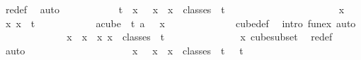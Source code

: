 \begin{isabellebody}
\ redef\ \isamarkupfalse%
\ auto\isanewline
\ \ \ \ \ \ \ \ \isamarkupfalse%
\ \isamarkupfalse%
\ {\isachardoublequoteopen}{\isacharbraceleft}{\kern0pt}{\isachardot}{\kern0pt}{\isachardot}{\kern0pt}{\isacharless}{\kern0pt}t{\isacharbraceright}{\kern0pt}\ {\isasymsubseteq}\ {\isacharbraceleft}{\kern0pt}x\ {}\ {\isacharbar}{\kern0pt}\ x\ {\isachardot}{\kern0pt}\ x\ {\isasymin}\ classes\ {}\ t\ {}{\isacharbraceright}{\kern0pt}{\isachardoublequoteclose}\ \isanewline
\ \ \ \ \ \ \ \ \isamarkupfalse%
\isanewline
\ \ \ \ \ \ \ \ \ \ \isamarkupfalse%
\ x\ \isamarkupfalse%
\ x{\isacharcolon}{\kern0pt}\ {\isachardoublequoteopen}x\ {\isasymin}\ {\isacharbraceleft}{\kern0pt}{\isachardot}{\kern0pt}{\isachardot}{\kern0pt}{\isacharless}{\kern0pt}t{\isacharbraceright}{\kern0pt}{\isachardoublequoteclose}\isanewline
\ \ \ \ \ \ \ \ \ \ \isamarkupfalse%
\ {\isachardoublequoteopen}{\isasymexists}a{\isasymin}cube\ {}\ t{\isachardot}{\kern0pt}\ a\ {}\ {\isacharequal}{\kern0pt}\ x{\isachardoublequoteclose}\isanewline
\ \ \ \ \ \ \ \ \ \ \ \ \isamarkupfalse%
\ cube{\isacharunderscore}{\kern0pt}def\ \isamarkupfalse%
\ {\isacharparenleft}{\kern0pt}intro\ fun{\isacharunderscore}{\kern0pt}ex{\isacharparenright}{\kern0pt}\ auto\isanewline
\ \ \ \ \ \ \ \ \ \ \isamarkupfalse%
\ \isamarkupfalse%
\ {\isachardoublequoteopen}x\ {\isasymin}\ {\isacharbraceleft}{\kern0pt}x\ {}\ {\isacharbar}{\kern0pt}x{\isachardot}{\kern0pt}\ x\ {\isasymin}\ classes\ {}\ t\ {}{\isacharbraceright}{\kern0pt}{\isachardoublequoteclose}\isanewline
\ \ \ \ \ \ \ \ \ \ \ \ \isamarkupfalse%
\ x\ cube{\isacharunderscore}{\kern0pt}subset\ \isamarkupfalse%
\ redef\ \isamarkupfalse%
\ auto\isanewline
\ \ \ \ \ \ \ \ \isamarkupfalse%
\isanewline
\ \ \ \ \ \ \ \ \isamarkupfalse%
\ \isamarkupfalse%
\ {\isacharasterisk}{\kern0pt}{\isacharasterisk}{\kern0pt}{\isacharcolon}{\kern0pt}\ {\isachardoublequoteopen}{\isacharbraceleft}{\kern0pt}x\ {}\ {\isacharbar}{\kern0pt}\ x\ {\isachardot}{\kern0pt}\ x\ {\isasymin}\ classes\ {}\ t\ {}{\isacharbraceright}{\kern0pt}\ {\isacharequal}{\kern0pt}\ {\isacharbraceleft}{\kern0pt}{\isachardot}{\kern0pt}{\isachardot}{\kern0pt}{\isacharless}{\kern0pt}t{\isacharbraceright}{\kern0pt}{\isachardoublequoteclose}\ \isamarkupfalse%

\end{isabellebody}
